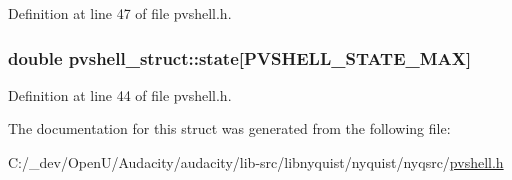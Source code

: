 Definition at line 47 of file pvshell.\+h.

\subsubsection[{\texorpdfstring{state}{state}}]{\setlength{\rightskip}{0pt plus 5cm}double pvshell\+\_\+struct\+::state\mbox{[}{\bf P\+V\+S\+H\+E\+L\+L\+\_\+\+S\+T\+A\+T\+E\+\_\+\+M\+AX}\mbox{]}}\hypertarget{structpvshell__struct_afc01b285127c630e7edd2772104baa3e}{}\label{structpvshell__struct_afc01b285127c630e7edd2772104baa3e}


Definition at line 44 of file pvshell.\+h.



The documentation for this struct was generated from the following file\+:\begin{DoxyCompactItemize}
\item 
C\+:/\+\_\+dev/\+Open\+U/\+Audacity/audacity/lib-\/src/libnyquist/nyquist/nyqsrc/\hyperlink{pvshell_8h}{pvshell.\+h}\end{DoxyCompactItemize}
